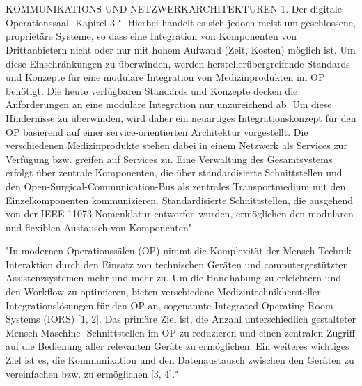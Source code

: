 \chapter{}
\label{sec:overview}

KOMMUNIKATIONS UND NETZWERKARCHITEKTUREN
1. Der digitale Operationssaal- Kapitel 3
	". Hierbei handelt es sich jedoch meist um geschlossene,
	proprietäre Systeme, so dass eine Integration von Komponenten von Drittanbietern
	nicht oder nur mit hohem Aufwand (Zeit, Kosten) möglich ist. Um diese Einschränkungen
	zu überwinden, werden herstellerübergreifende Standards und Konzepte für
	eine modulare Integration von Medizinprodukten im OP benötigt. Die heute verfügbaren
	Standards und Konzepte decken die Anforderungen an eine modulare Integration
	nur unzureichend ab. Um diese Hindernisse zu überwinden, wird daher ein
	neuartiges Integrationskonzept für den OP basierend auf einer service-orientierten
	Architektur vorgestellt.
	Die verschiedenen Medizinprodukte stehen dabei in einem Netzwerk als Services
	zur Verfügung bzw. greifen auf Services zu. Eine Verwaltung des Gesamtsystems
	erfolgt über zentrale Komponenten, die über standardisierte Schnittstellen und den
	Open-Surgical-Communication-Bus als zentrales Transportmedium mit den Einzelkomponenten
	kommunizieren. Standardisierte Schnittstellen, die ausgehend von der
	IEEE-11073-Nomenklatur entworfen wurden, ermöglichen den modularen und flexiblen
	Austausch von Komponenten"
	
	"In modernen Operationssälen (OP) nimmt die Komplexität der Mensch-Technik-
	Interaktion durch den Einsatz von technischen Geräten und computergestützten
	Assistenzsystemen mehr und mehr zu. Um die Handhabung zu erleichtern und den
	Workflow zu optimieren, bieten verschiedene Medizintechnikhersteller Integrationslösungen
	für den OP an, sogenannte Integrated Operating Room Systems (IORS)
	[1, 2]. Das primäre Ziel ist, die Anzahl unterschiedlich gestalteter Mensch-Maschine-
	Schnittstellen im OP zu reduzieren und einen zentralen Zugriff auf die Bedienung
	aller relevanten Geräte zu ermöglichen.
	Ein weiteres wichtiges Ziel ist es, die Kommunikation und den Datenaustausch
	zwischen den Geräten zu vereinfachen bzw. zu ermöglichen [3, 4]."
	
